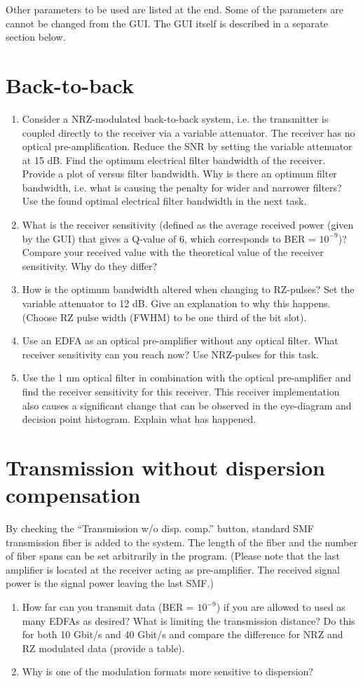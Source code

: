 \documentclass[10pt,letterpaper]{article}
\begin{document}
Other parameters to be used are listed at the end. Some of the parameters are cannot be changed from the GUI. The GUI itself is described in a separate section below.

\section{Back-to-back}
\begin{enumerate}
\item
Consider a NRZ-modulated back-to-back system, i.e. the transmitter is coupled directly to the receiver via a variable attenuator. The receiver has no optical pre-amplification. Reduce the SNR by setting the variable attenuator at 15 dB. Find the optimum electrical filter bandwidth of the receiver. Provide a plot of versus filter bandwidth. Why is there an optimum filter bandwidth, i.e. what is causing the penalty for wider and narrower filters? Use the found optimal electrical filter bandwidth in the next task.
\item
What is the receiver sensitivity (defined as the average received power (given by the GUI) that gives a Q-value of 6, which corresponds to BER = $10^{-9}$)? Compare your received value with the theoretical value of the receiver sensitivity. Why do they differ?
\item
How is the optimum bandwidth altered when changing to RZ-pulses? Set the variable attenuator to 12 dB. Give an explanation to why this happens. (Choose RZ pulse width (FWHM) to be one third of the bit slot).
\item
Use an EDFA as an optical pre-amplifier without any optical filter. What receiver sensitivity can you reach now? Use NRZ-pulses for this task.
\item
Use the 1 nm optical filter in combination with the optical pre-amplifier and find the receiver sensitivity for this receiver. This receiver implementation also causes a significant change that can be observed in the eye-diagram and decision point histogram. Explain what has happened.
\end{enumerate}
\section{Transmission without dispersion compensation}
By checking the ``Transmission w/o disp. comp.'' button, standard SMF transmission fiber is added to the system. The length of the fiber and the number of fiber spans can be set arbitrarily in the program. (Please note that the last amplifier is located at the receiver acting as pre-amplifier. The received signal power is the signal power leaving the last SMF.)
\begin{enumerate}
\item
How far can you transmit data (BER = $10^{-9}$) if you are allowed to used as many EDFAs as desired? What is limiting the transmission distance? Do this for both 10 Gbit/s and 40 Gbit/s and compare the difference for NRZ and RZ modulated data (provide a table).
\item
Why is one of the modulation formats more sensitive to dispersion?
\end{enumerate}
\end{document}
